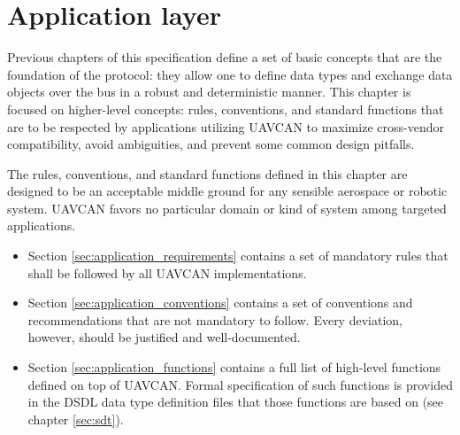 \chapter{Application layer}\label{sec:application}

Previous chapters of this specification define a set of basic concepts that are the foundation of the protocol:
they allow one to define data types and exchange data objects over the bus in a robust and deterministic manner.
This chapter is focused on higher-level concepts: rules, conventions, and standard functions that are to be
respected by applications utilizing UAVCAN to maximize cross-vendor compatibility, avoid ambiguities, and
prevent some common design pitfalls.

The rules, conventions, and standard functions defined in this chapter are designed to be an acceptable middle
ground for any sensible aerospace or robotic system.
UAVCAN favors no particular domain or kind of system among targeted applications.

\begin{itemize}
    \item Section \ref{sec:application_requirements} contains a set of mandatory rules that shall be
    followed by all UAVCAN implementations.

    \item Section \ref{sec:application_conventions} contains a set of conventions and recommendations that
    are not mandatory to follow. Every deviation, however, should be justified and well-documented.

    \item Section \ref{sec:application_functions} contains a full list of high-level functions defined on
    top of UAVCAN. Formal specification of such functions is provided in the DSDL data type definition files that
    those functions are based on (see chapter \ref{sec:sdt}).
\end{itemize}

\clearpage
\clearpage
\clearpage
